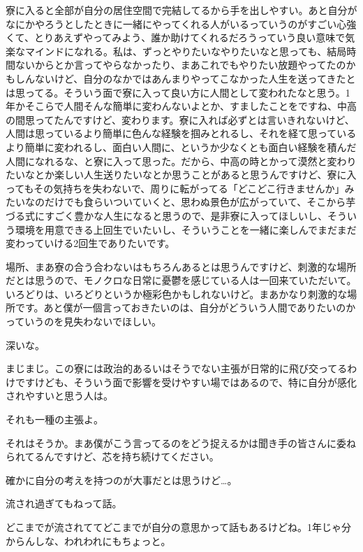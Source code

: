 \begin{multicols}{2}
寮に入ると全部が自分の居住空間で完結してるから手を出しやすい。あと自分がなにかやろうとしたときに一緒にやってくれる人がいるっていうのがすごい心強くて、とりあえずやってみよう、誰か助けてくれるだろうっていう良い意味で気楽なマインドになれる。私は、ずっとやりたいなやりたいなと思っても、結局時間ないからとか言ってやらなかったり、まあこれでもやりたい放題やってたのかもしんないけど、自分のなかではあんまりやってこなかった人生を送ってきたとは思ってる。そういう面で寮に入って良い方に人間として変われたなと思う。1年かそこらで人間そんな簡単に変わんないよとか、すましたことをですね、中高の間思ってたんですけど、変わります。寮に入れば必ずとは言いきれないけど、人間は思っているより簡単に色んな経験を掴みとれるし、それを経て思っているより簡単に変われるし、面白い人間に、というか少なくとも面白い経験を積んだ人間になれるな、と寮に入って思った。だから、中高の時とかって漠然と変わりたいなとか楽しい人生送りたいなとか思うことがあると思うんですけど、寮に入ってもその気持ちを失わないで、周りに転がってる「どこどこ行きませんか」みたいなのだけでも食らいついていくと、思わぬ景色が広がっていて、そこから芋づる式にすごく豊かな人生になると思うので、是非寮に入ってほしいし、そういう環境を用意できる上回生でいたいし、そういうことを一緒に楽しんでまだまだ変わっていける2回生でありたいです。

場所、まあ寮の合う合わないはもちろんあるとは思うんですけど、刺激的な場所だとは思うので、モノクロな日常に憂鬱を感じている人は一回来ていただいて。いろどりは、いろどりというか極彩色かもしれないけど。まあかなり刺激的な場所です。あと僕が一個言っておきたいのは、自分がどういう人間でありたいのかっていうのを見失わないでほしい。

深いな。

まじまじ。この寮には政治的あるいはそうでない主張が日常的に飛び交ってるわけですけども、そういう面で影響を受けやすい場ではあるので、特に自分が感化されやすいと思う人は。

それも一種の主張よ。

それはそうか。まあ僕がこう言ってるのをどう捉えるかは聞き手の皆さんに委ねられてるんですけど、芯を持ち続けてください。

確かに自分の考えを持つのが大事だとは思うけど…。

流され過ぎてもねって話。

どこまでが流されててどこまでが自分の意思かって話もあるけどね。1年じゃ分からんしな、われわれにもちょっと。


\end{multicols}
